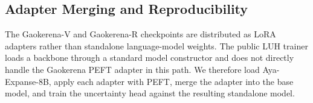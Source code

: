\documentclass[conference]{IEEEtran}
\begin{document}
\begin{table}[ht]

\centering

\small

\caption{Training configuration used for both uncertainty heads.}

\label{tab:training}


\end{table}

\subsection{Adapter Merging and Reproducibility}

The Gaokerena-V and Gaokerena-R checkpoints are distributed as LoRA adapters rather than standalone language-model weights. The public LUH trainer loads a backbone through a standard model constructor and does not directly handle the Gaokerena PEFT adapter in this path. We therefore load Aya-Expanse-8B, apply each adapter with PEFT, merge the adapter into the base model, and train the uncertainty head against the resulting standalone model.
\end{document}
